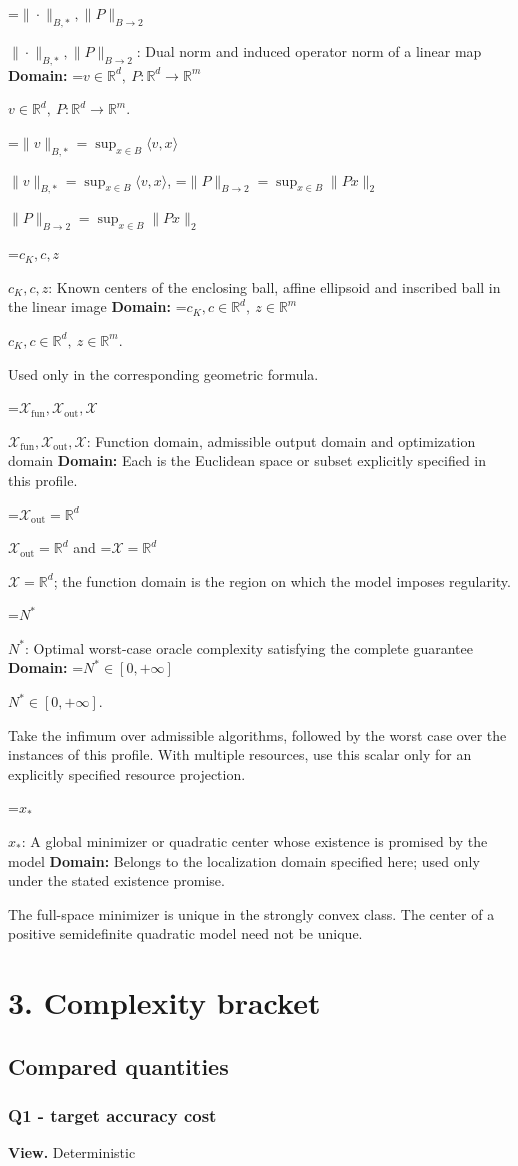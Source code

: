 \documentclass[10pt,a4paper]{article}
\newcommand{\AtlasMath}[1]{\par\begingroup\centering\setbox0=\hbox{$\displaystyle #1$}\ifdim\wd0>1.4\linewidth\typeout{ATLAS WIDE FORMULA: \the\wd0}\fi\ifdim\wd0>\linewidth\resizebox{\linewidth}{!}{\box0}\else\box0\fi\par\endgroup}
\newcommand{\AtlasInlineMath}[1]{\begingroup\setbox0=\hbox{$#1$}\ifdim\wd0>.4\linewidth\endgroup\AtlasMath{#1}\else\endgroup$#1$\fi}
\begin{document}
\AtlasInlineMath{\|\cdot\|_{B,*},\|P\|_{B\to2}}: Dual norm and induced operator norm of a linear map \textbf{Domain:} \AtlasInlineMath{v\in\mathbb{R}^d,\ P:\mathbb{R}^d\to\mathbb{R}^m}.

\AtlasInlineMath{\|v\|_{B,*}=\sup_{x\in B}\langle v,x\rangle}, \AtlasInlineMath{\|P\|_{B\to2}=\sup_{x\in B}\|Px\|_2}

\AtlasInlineMath{c_K,c,z}: Known centers of the enclosing ball, affine ellipsoid and inscribed ball in the linear image \textbf{Domain:} \AtlasInlineMath{c_K,c\in\mathbb{R}^d,\ z\in\mathbb{R}^m}.

Used only in the corresponding geometric formula.

\AtlasInlineMath{\mathcal{X}_{\mathrm{fun}},\mathcal{X}_{\mathrm{out}},\mathcal{X}}: Function domain, admissible output domain and optimization domain \textbf{Domain:} Each is the Euclidean space or subset explicitly specified in this profile.

\AtlasInlineMath{\mathcal{X}_{\mathrm{out}}=\mathbb{R}^d} and \AtlasInlineMath{\mathcal{X}=\mathbb{R}^d}; the function domain is the region on which the model imposes regularity.

\AtlasInlineMath{N^*}: Optimal worst-case oracle complexity satisfying the complete guarantee \textbf{Domain:} \AtlasInlineMath{N^*\in[0,+\infty]}.

Take the infimum over admissible algorithms, followed by the worst case over the instances of this profile. With multiple resources, use this scalar only for an explicitly specified resource projection.

\AtlasInlineMath{x_*}: A global minimizer or quadratic center whose existence is promised by the model \textbf{Domain:} Belongs to the localization domain specified here; used only under the stated existence promise.

The full-space minimizer is unique in the strongly convex class. The center of a positive semidefinite quadratic model need not be unique.

\section{3. Complexity bracket}
\subsection{Compared quantities}
\subsubsection{Q1 - target accuracy cost}
\textbf{View.} Deterministic
\end{document}
